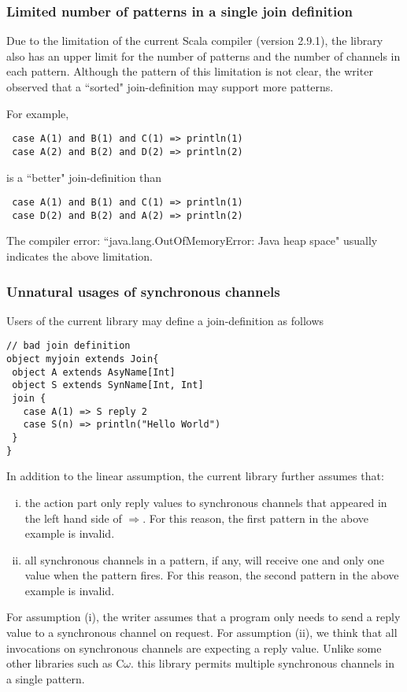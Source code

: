 \subsubsection{Limited number of patterns in a single join definition}
Due to the limitation of the current Scala compiler (version 2.9.1), the library also has an upper limit for the number of patterns and the number of channels in each pattern.  Although the pattern of this limitation is not clear, the writer observed that a ``sorted" join-definition may support more patterns.

For example,
\begin{lstlisting}
 case A(1) and B(1) and C(1) => println(1)
 case A(2) and B(2) and D(2) => println(2)
\end{lstlisting}
is a ``better" join-definition than
\begin{lstlisting}
 case A(1) and B(1) and C(1) => println(1)
 case D(2) and B(2) and A(2) => println(2)
\end{lstlisting}
The compiler error: ``java.lang.OutOfMemoryError: Java heap space" usually indicates the above limitation.

\subsubsection{Unnatural usages of synchronous channels}

Users of the current library may define a join-definition as follows
\begin{lstlisting}
// bad join definition
object myjoin extends Join{
 object A extends AsyName[Int]
 object S extends SynName[Int, Int]
 join {
   case A(1) => S reply 2
   case S(n) => println("Hello World")
 }
}
\end{lstlisting}

In addition to the linear assumption, the current library further assumes that:
\begin{enumerate}[(i)]
  \item  the action part only reply values to synchronous channels that appeared in the left hand side of $\Rightarrow$.   For this reason, the first pattern in the above example is invalid.
  \item all synchronous channels in a pattern, if any, will receive one and only one value when the pattern fires.  For this reason, the second pattern in the above example is invalid.
\end{enumerate}

For assumption (i), the writer assumes that a program only needs to send a reply value to a synchronous channel on request.  For assumption (ii), we think that all invocations on synchronous channels are expecting a reply value.  Unlike some other libraries such as C$\omega$. this library permits multiple synchronous channels in a single pattern.  

